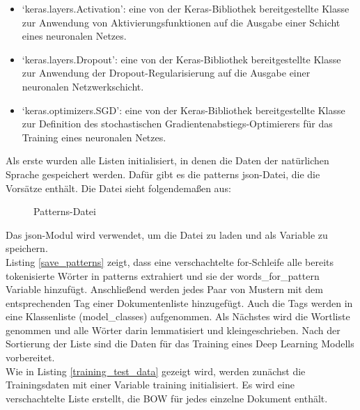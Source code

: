 \begin{itemize}
    \item `keras.layers.Activation': eine von der Keras-Bibliothek bereitgestellte Klasse zur Anwendung von Aktivierungsfunktionen auf die Ausgabe einer Schicht eines neuronalen Netzes.
    \item `keras.layers.Dropout': eine von der Keras-Bibliothek bereitgestellte Klasse zur Anwendung der Dropout-Regularisierung auf die Ausgabe einer neuronalen Netzwerkschicht.
    \item `keras.optimizers.SGD': eine von der Keras-Bibliothek bereitgestellte Klasse zur Definition des stochastischen Gradientenabstiegs-Optimierers für das Training eines neuronalen Netzes.
\end{itemize}
Als erste wurden alle Listen initialisiert, in denen die Daten der natürlichen Sprache gespeichert werden. 
Dafür gibt es die \glqq{}patterns\grqq{} json-Datei, die die \glqq{}Vorsätze\grqq{} enthält. Die Datei sieht folgendemaßen aus:
\begin{figure}[H]
    \centering
    \caption{\label{figure:Json_Patterns}Patterns-Datei}
\end{figure}
\noindent
Das json-Modul wird verwendet, um die Datei zu laden und als Variable zu speichern.\\

Listing \ref{save_patterns} zeigt, dass eine verschachtelte for-Schleife alle bereits tokenisierte Wörter in \glqq{}patterns\grqq{} extrahiert und sie der \glqq{}words\_for\_pattern\grqq{} Variable hinzufügt.
Anschließend werden jedes Paar von Mustern mit dem entsprechenden Tag einer Dokumentenliste hinzugefügt. 
Auch die Tags werden in eine Klassenliste (\glqq{}model\_classes\grqq{}) aufgenommen.
Als Nächstes wird die Wortliste genommen und alle Wörter darin lemmatisiert und kleingeschrieben. 
Nach der Sortierung der Liste sind die Daten für das Training eines Deep Learning Modells vorbereitet.\\

Wie in Listing \ref{training_test_data} gezeigt wird, werden zunächst die Trainingsdaten mit einer Variable \glqq{}training\grqq{} initialisiert. 
Es wird eine verschachtelte Liste erstellt, die \ac{BOW} für jedes einzelne Dokument enthält. 
